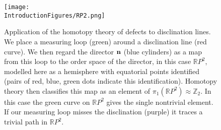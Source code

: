 \begin{figure}[htbp]
\centering
\texttt{[image: \\IntroductionFigures/RP2.png]}
\caption{Application of the homotopy theory of defects to disclination lines. We place a measuring loop (green) around a disclination line (red curve). We then regard the director $\bf n$ (blue cylinders) as a map from this loop to the order space of the director, in this case $\mathbb{R}P^2$, modelled here as a hemisphere with equatorial points identified (pairs of red, blue, green dots indicate this identification). Homotopy theory then classifies this map as an element of $\pi_1(\mathbb{R}P^2) \approx \mathbb{Z}_2$. In this case the green curve on $\mathbb{R}P^2$ gives the single nontrivial element. If our measuring loop misses the disclination (purple) it traces a trivial path in $\mathbb{R}P^2$.}
\label{fig:RP2}
\end{figure}

